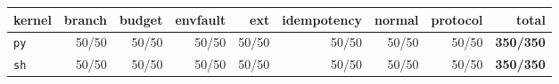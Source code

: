 \begin{tabular}{lrrrrrrrr}
\toprule
kernel & branch & budget & envfault & ext & idempotency & normal & protocol & total \\
\midrule
\texttt{py} & 50/50 & 50/50 & 50/50 & 50/50 & 50/50 & 50/50 & 50/50 & \textbf{350/350} \\
\texttt{sh} & 50/50 & 50/50 & 50/50 & 50/50 & 50/50 & 50/50 & 50/50 & \textbf{350/350} \\
\bottomrule
\end{tabular}
